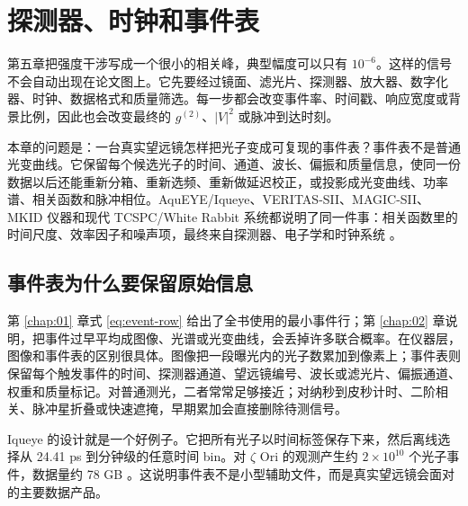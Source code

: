 \chapter{探测器、时钟和事件表}
\label{chap:06}

\begin{chapteropening}
第五章把强度干涉写成一个很小的相关峰，典型幅度可以只有 \(10^{-6}\)。这样的信号不会自动出现在论文图上。它先要经过镜面、滤光片、探测器、放大器、数字化器、时钟、数据格式和质量筛选。每一步都会改变事件率、时间戳、响应宽度或背景比例，因此也会改变最终的 \(g^{(2)}\)、\(|V|^2\) 或脉冲到达时刻。

本章的问题是：一台真实望远镜怎样把光子变成可复现的事件表？事件表不是普通光变曲线。它保留每个候选光子的时间、通道、波长、偏振和质量信息，使同一份数据以后还能重新分箱、重新选频、重新做延迟校正，或投影成光变曲线、功率谱、相关函数和脉冲相位。AquEYE/Iqueye、VERITAS-SII、MAGIC-SII、MKID 仪器和现代 TCSPC/White Rabbit 系统都说明了同一件事：相关函数里的时间尺度、效率因子和噪声项，最终来自探测器、电子学和时钟系统 \citep{2009JMOp...56..261B,2009A&A...508..531N,2015SPIE.9504E..0CZ,2020NatAs...4.1164A,2024MNRAS.529.4387A,2013PASP..125.1348M,2018PASP..130f5001M,2020RScI...91a3108W}。
\end{chapteropening}

\section{事件表为什么要保留原始信息}

第 \ref{chap:01} 章式 \eqref{eq:event-row} 给出了全书使用的最小事件行；第 \ref{chap:02} 章说明，把事件过早平均成图像、光谱或光变曲线，会丢掉许多联合概率。在仪器层，图像和事件表的区别很具体。图像把一段曝光内的光子数累加到像素上；事件表则保留每个触发事件的时间、探测器通道、望远镜编号、波长或滤光片、偏振通道、权重和质量标记。对普通测光，二者常常足够接近；对纳秒到皮秒计时、二阶相关、脉冲星折叠或快速遮掩，早期累加会直接删除待测信号。

Iqueye 的设计就是一个好例子。它把所有光子以时间标签保存下来，然后离线选择从 24.41 ps 到分钟级的任意时间 bin。对 \(\zeta\) Ori 的观测产生约 \(2\times10^{10}\) 个光子事件，数据量约 78 GB \citep{2009A&A...508..531N,2019CoSka..49...85Z}。这说明事件表不是小型辅助文件，而是真实望远镜会面对的主要数据产品。

